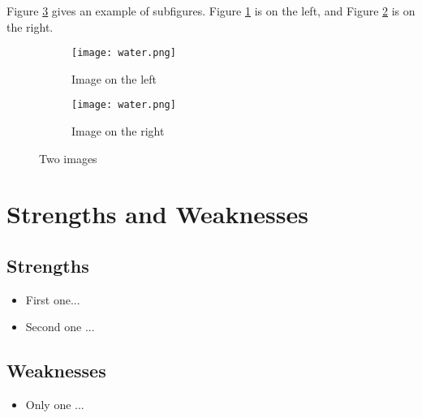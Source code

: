 \documentclass[12pt]{article}  %
\begin{document}
Figure \ref{fig:subfigures} gives an example of subfigures. Figure \ref{subfig:left} is on the left, and Figure \ref{subfig:right} is on the right.

\begin{figure}[htbp]
\centering
\begin{subfigure}[b]{.4\textwidth}
\texttt{[image: water.png]}
\caption{Image on the left}\label{subfig:left}
\end{subfigure}
\begin{subfigure}[b]{.4\textwidth}
\texttt{[image: water.png]}
\caption{Image on the right}\label{subfig:right}
\end{subfigure}
\caption{Two images}\label{fig:subfigures}
\end{figure}

\section{Strengths and Weaknesses}
\subsection{Strengths}
\begin{itemize}
    \item First one...
    \item Second one ...
\end{itemize}

\subsection{Weaknesses}
\begin{itemize}
    \item Only one ...
 \end{itemize}
\end{document}
